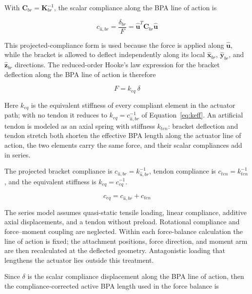 With $\mathbf{C}_{br}=\mathbf{K}_{br}^{-1}$, the scalar compliance along the BPA line of action is

\begin{equation}
c_{\hat{u},br} = \frac{\delta_{br}}{F} = \hat{\mathbf{u}}^{T} \mathbf{C}_{br} \hat{\mathbf{u}}
\label{eq:keff}
\end{equation}

This projected-compliance form is used because the force is applied along $\hat{\mathbf{u}}$, while the bracket is allowed to deflect independently along its local $\hat{\mathbf{x}}_{br}$, $\hat{\mathbf{y}}_{br}$, and $\hat{\mathbf{z}}_{br}$ directions. The reduced-order Hooke's law expression for the bracket deflection along the BPA line of action is therefore

\begin{equation} F = k_{eq} \: \delta
\label{eq:hookereduced}
\end{equation}

Here $k_{eq}$ is the equivalent stiffness of every compliant element in the actuator path; with no tendon it reduces to $k_{eq}=c_{\hat{u},br}^{-1}$ of Equation~\eqref{eq:keff}. An artificial tendon is modeled as an axial spring with stiffness $k_{ten}$: bracket deflection and tendon stretch both shorten the effective BPA length along the actuator line of action, the two elements carry the same force, and their scalar compliances add in series.

The projected bracket compliance is $c_{\hat{u},br}=k_{\hat{u},br}^{-1}$, tendon compliance is $c_{ten}=k_{ten}^{-1}$, and the equivalent stiffness is $k_{eq}=c_{eq}^{-1}$.\par
\begin{equation} c_{eq} = c_{\hat{u},br} + c_{ten}
\label{eq:equivalentstiffness}
\end{equation}

The series model assumes quasi-static tensile loading, linear compliance, additive axial displacements, and a tendon without preload. Rotational compliance and force--moment coupling are neglected. Within each force-balance calculation the line of action is fixed; the attachment positions, force direction, and moment arm are then recalculated at the deflected geometry. Antagonistic loading that lengthens the actuator lies outside this treatment.

Since $\delta$ is the scalar compliance displacement along the BPA line of action, then the compliance-corrected active BPA length used in the force balance is

